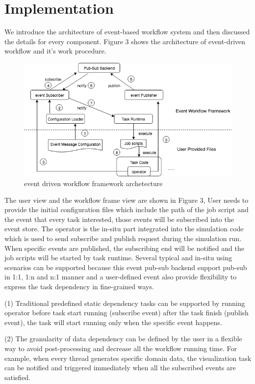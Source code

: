 
\section{Implementation}
We introduce the architecture of event-based workflow system and then discussed the details for every component. Figure 3 shows the architecture of event-driven workflow and it's work procedure.

\begin{figure} 
\centering
\includegraphics[width=.95\linewidth]{./figure/edflowarchitecture.jpg}
\caption{event driven workflow framework archetecture}
 \label{fg:state}
\end{figure} 


The user view and the workflow frame view are shown in Figure 3,  User needs to provide the initial configuration files which include the path of the job script and the event that every task interested, those events will be subscribed into the event store. The operator is the in-situ part integrated into the simulation code which is used to send subscribe and publish request during the simulation run. When specific events are published, the subscribing end will be notified and the job scripts will be started by task runtime. Several typical and in-situ using scenarios can be supported because this event pub-sub backend support pub-sub in 1:1, 1:n and n:1 manner and a user-defined event also provide flexibility to express the task dependency in fine-grained ways. 

(1) Traditional predefined static dependency tasks can be supported by running operator before task start running (subscribe event) after the task finish (publish event), the task will start running only when the specific event happens.

(2) The granularity of data dependency can be defined by the user in a flexible way to avoid post-processing and decrease all the workflow running time. For example, when every thread generates specific domain data, the visualization task can be notified and triggered immediately when all the subscribed events are satisfied.

